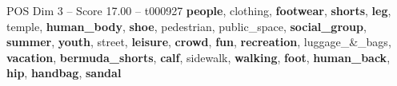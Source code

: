 \begin{textsample}{POS Dim 3 – Score 17.00 – t000927}  \label{ex:f3_pos_018}
\textbf{people}, clothing, \textbf{footwear}, \textbf{shorts}, \textbf{leg}, temple, \textbf{human\_body}, \textbf{shoe}, pedestrian, public\_space, \textbf{social\_group}, \textbf{summer}, \textbf{youth}, street, \textbf{leisure}, \textbf{crowd}, \textbf{fun}, \textbf{recreation}, luggage\_\&\_bags, \textbf{vacation}, \textbf{bermuda\_shorts}, \textbf{calf}, sidewalk, \textbf{walking}, \textbf{foot}, \textbf{human\_back}, \textbf{hip}, \textbf{handbag}, \textbf{sandal}

\end{textsample}
